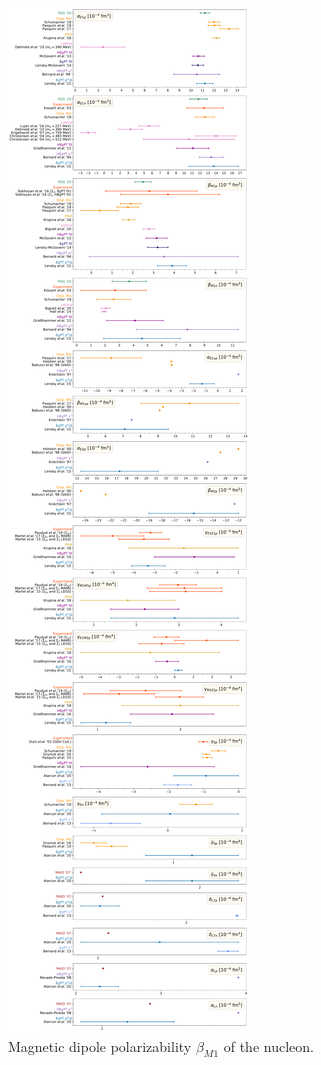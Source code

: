 \documentclass[preprints,review,accept,moreauthors,pdftex]{Definitions/mdpi}
\def\be{\beta}
\begin{document}
\begin{figure}[t]
\centering
\includegraphics[width=\columnwidth]{Figures/betaM1Pol.pdf}
\caption{Magnetic dipole polarizability $\be_{M1}$  of the nucleon. \label{betaM1Pol}}
\end{figure} 
\end{document}
